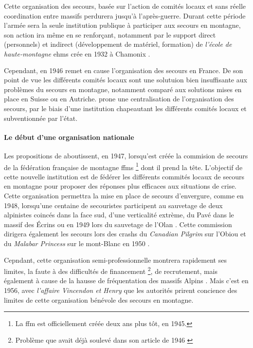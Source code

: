 Cette organisation des secours, basée sur l'action de
comités locaux et sans réelle coordination entre massifs perdurera
jusqu'à l'après-guerre. Durant cette période l'armée sera la seule
institution publique à participer aux secours en montagne, son action
ira même en se renforçant, notamment par le support direct
(personnels) et indirect (développement de matériel, formation) de
\emph{l'école de haute-montagne} \acp{ehm} crée en 1932 à Chamonix
\autocite{Mezin2016}.

Cependant, en 1946 \textcite{Devies1946} remet en cause l'organisation
des secours en France. De son point de vue les différents comités
locaux sont une solutuion bien insuffisante aux problèmes du secours
en montagne, notamment comparé aux solutions mises en place en Suisse
ou en Autriche.  prone une centralisation de
l'organisation des secours, par le biais d'une institution chapeautant
les différents comités locaux et subventionnée par l'état.

\paragraph{Le début d'une organisation nationale}

Les propositions de  aboutissent, en 1947, lorsqu'est
créée la commision de secours de la fédération française de montagne
\acp{ffm} \footnote{La \ac{ffm} est officiellement créée deux ans plus
  tôt, en 1945.}  dont il prend la tête. L'objectif de cette nouvelle
institution est de fédérer les différents commités locaux de secours
en montagne pour proposer des réponses plus efficaces aux situations
de crise. Cette organisation permettra la mise en place de secours
d'envergure, comme en 1948, lorsqu'une centaine de secouristes
participent au sauvetage de deux alpinistes coincés dans la face sud,
d'une verticalité extrème, du Pavé dans le massif des Écrins
\autocite{Romanaz2018} ou en 1949 lors du sauvetage de l'Olan
\autocite{Mollaret1993}. Cette commission dirigera également les
secours lors des crashs du \emph{Canadian Pilgrim} sur l'Obiou et du
\emph{Malabar Princess} sur le mont-Blanc en 1950
\autocite{CFDLD,Mollaret1993,SDSM2013}.

Cepndant, cette organisation semi-professionnelle montrera rapidement
ses limites, la faute à des difficultés de financement
\footnote{Problème que  avait déjà soulevé dans son
  article de 1946 \autocite{Devies1946}}, de recrutement, mais
également à cause de la hausse de fréquentation des massifs Alpins
\autocite{CFDLD}. Mais c'est en 1956, avec \emph{l'affaire Vincendon
  et Henry} que les autorités prirent concience des limites de cette
organisation bénévole des secours en montagne.

